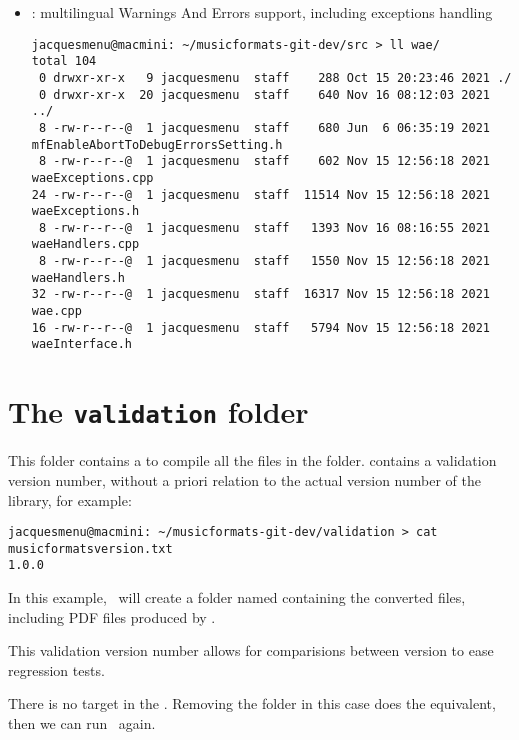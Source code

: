 \begin{itemize}
\item {} : multilingual Warnings And Errors support, including exceptions handling
\begin{lstlisting}[language=Terminal]
jacquesmenu@macmini: ~/musicformats-git-dev/src > ll wae/
total 104
 0 drwxr-xr-x   9 jacquesmenu  staff    288 Oct 15 20:23:46 2021 ./
 0 drwxr-xr-x  20 jacquesmenu  staff    640 Nov 16 08:12:03 2021 ../
 8 -rw-r--r--@  1 jacquesmenu  staff    680 Jun  6 06:35:19 2021 mfEnableAbortToDebugErrorsSetting.h
 8 -rw-r--r--@  1 jacquesmenu  staff    602 Nov 15 12:56:18 2021 waeExceptions.cpp
24 -rw-r--r--@  1 jacquesmenu  staff  11514 Nov 15 12:56:18 2021 waeExceptions.h
 8 -rw-r--r--@  1 jacquesmenu  staff   1393 Nov 16 08:16:55 2021 waeHandlers.cpp
 8 -rw-r--r--@  1 jacquesmenu  staff   1550 Nov 15 12:56:18 2021 waeHandlers.h
32 -rw-r--r--@  1 jacquesmenu  staff  16317 Nov 15 12:56:18 2021 wae.cpp
16 -rw-r--r--@  1 jacquesmenu  staff   5794 Nov 15 12:56:18 2021 waeInterface.h
\end{lstlisting}

\end{itemize}


\section{The {\tt validation} folder}

This folder contains a  to compile all the files in the  folder.
 contains a validation version number, without a priori relation to the actual version number of the library, for example:
\begin{lstlisting}[language=Terminal]
jacquesmenu@macmini: ~/musicformats-git-dev/validation > cat musicformatsversion.txt
1.0.0
\end{lstlisting}

In this example, \make\ will create a folder named  containing the converted files, including PDF files produced by .

This validation version number allows for comparisions between version to ease regression tests.

There is no  target in the . Removing the  folder in this case does the equivalent, then we can run \make\ again.




